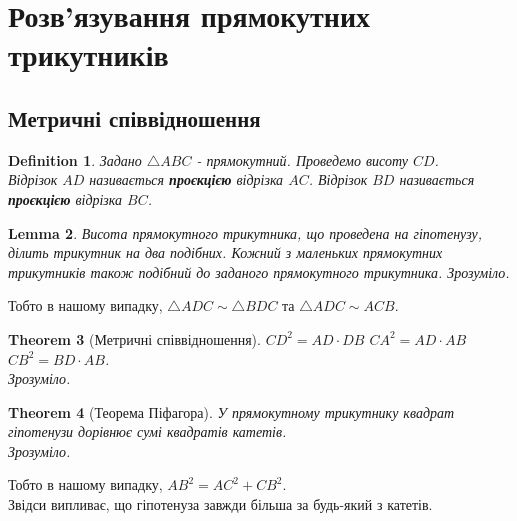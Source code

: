 \documentclass[a4paper, 10pt]{article}
\theoremstyle{theoremdd}
\newtheorem{theorem}{Theorem}[subsection]
\theoremstyle{theoremdd}
\theoremstyle{theoremdd}
\newtheorem{definition}[theorem]{Definition}
\theoremstyle{theoremdd}
\theoremstyle{theoremdd}
\theoremstyle{theoremdd}
\theoremstyle{theoremdd}
\theoremstyle{theoremdd}
\newtheorem{lemma}[theorem]{Lemma}
\theoremstyle{theoremdd}
\begin{document}
\newpage

\section{Розв'язування прямокутних трикутників}
\subsection{Метричні співвідношення}
\begin{definition}
Задано $\triangle ABC$ - прямокутний. Проведемо висоту $CD$.\\
Відрізок $AD$ називається \textbf{проєкцією} відрізка $AC$. Відрізок $BD$ називається \textbf{проєкцією} відрізка $BC$.
\begin{figure}[H]
\centering
{}
\end{figure}
\end{definition}

\begin{lemma}
Висота прямокутного трикутника, що проведена на гіпотенузу, ділить трикутник на два подібних. Кожний з маленьких прямокутних трикутників також подібний до заданого прямокутного трикутника.
\textit{Зрозуміло.}
\end{lemma}
Тобто в нашому випадку, $\triangle ADC \sim \triangle BDC$ та $\triangle ADC \sim ACB$.

\begin{theorem}[Метричні співвідношення]
$CD^2 = AD \cdot DB$ \hspace{1cm} $CA^2 = AD \cdot AB$ \hspace{1cm} $CB^2 = BD \cdot AB$.\\
\textit{Зрозуміло.}
\end{theorem}

\begin{theorem}[Теорема Піфагора]
У прямокутному трикутнику квадрат гіпотенузи дорівнює сумі квадратів катетів.\\
\textit{Зрозуміло.}
\end{theorem}
Тобто в нашому випадку, $AB^2 = AC^2 + CB^2$.\\
Звідси випливає, що гіпотенуза завжди більша за будь-який з катетів.
\end{document}
